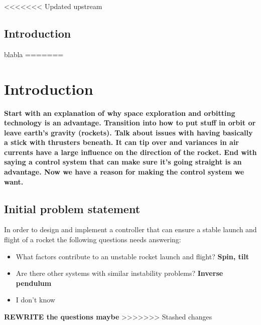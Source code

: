 <<<<<<< Updated upstream

\section{Introduction}
blabla
=======
\chapter{Introduction}
\textbf{Start with an explanation of why space exploration and orbitting technology is an advantage. Transition into how to put stuff in orbit or leave earth's gravity (rockets). Talk about issues with having basically a stick with thrusters beneath. It can tip over and variances in air currents have a large influence on the direction of the rocket. End with saying a control system that can make sure it's going straight is an advantage. Now we have a reason for making the control system we want.}

\section{Initial problem statement}
In order to design and implement a controller that can ensure a stable launch and flight of a rocket the following questions needs answering: 
\begin{itemize}
\item What factors contribute to an unstable rocket launch and flight? \textbf{Spin, tilt}
\item Are there other systems with similar instability problems? \textbf{Inverse pendulum}
\item I don't know
\end{itemize}
\textbf{REWRITE the questions maybe}
>>>>>>> Stashed changes
